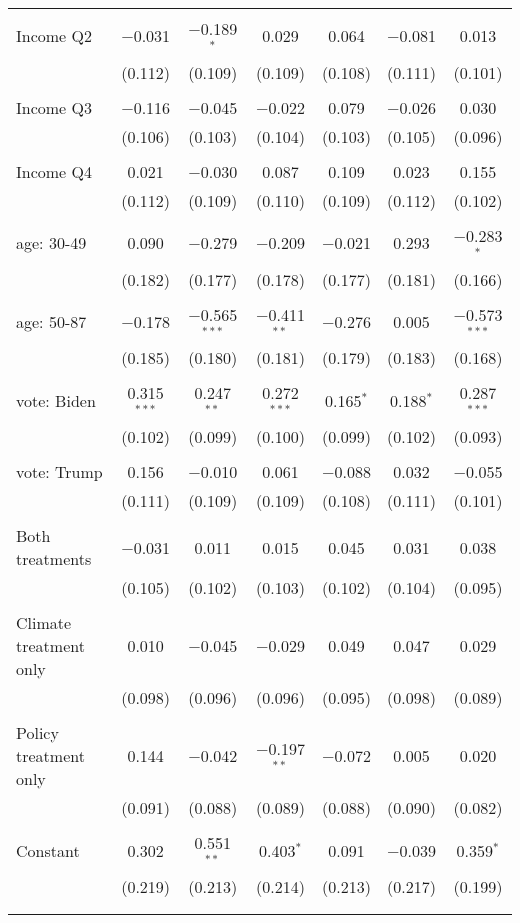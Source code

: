 \begin{tabular}{@{\extracolsep{5pt}}lcccccc}
  & & & & & & \\ 
 Income Q2 & $-$0.031 & $-$0.189$^{*}$ & 0.029 & 0.064 & $-$0.081 & 0.013 \\ 
  & (0.112) & (0.109) & (0.109) & (0.108) & (0.111) & (0.101) \\ 
  & & & & & & \\ 
 Income Q3 & $-$0.116 & $-$0.045 & $-$0.022 & 0.079 & $-$0.026 & 0.030 \\ 
  & (0.106) & (0.103) & (0.104) & (0.103) & (0.105) & (0.096) \\ 
  & & & & & & \\ 
 Income Q4 & 0.021 & $-$0.030 & 0.087 & 0.109 & 0.023 & 0.155 \\ 
  & (0.112) & (0.109) & (0.110) & (0.109) & (0.112) & (0.102) \\ 
  & & & & & & \\ 
 age: 30-49 & 0.090 & $-$0.279 & $-$0.209 & $-$0.021 & 0.293 & $-$0.283$^{*}$ \\ 
  & (0.182) & (0.177) & (0.178) & (0.177) & (0.181) & (0.166) \\ 
  & & & & & & \\ 
 age: 50-87 & $-$0.178 & $-$0.565$^{***}$ & $-$0.411$^{**}$ & $-$0.276 & 0.005 & $-$0.573$^{***}$ \\ 
  & (0.185) & (0.180) & (0.181) & (0.179) & (0.183) & (0.168) \\ 
  & & & & & & \\ 
 vote: Biden & 0.315$^{***}$ & 0.247$^{**}$ & 0.272$^{***}$ & 0.165$^{*}$ & 0.188$^{*}$ & 0.287$^{***}$ \\ 
  & (0.102) & (0.099) & (0.100) & (0.099) & (0.102) & (0.093) \\ 
  & & & & & & \\ 
 vote: Trump & 0.156 & $-$0.010 & 0.061 & $-$0.088 & 0.032 & $-$0.055 \\ 
  & (0.111) & (0.109) & (0.109) & (0.108) & (0.111) & (0.101) \\ 
  & & & & & & \\ 
 Both treatments & $-$0.031 & 0.011 & 0.015 & 0.045 & 0.031 & 0.038 \\ 
  & (0.105) & (0.102) & (0.103) & (0.102) & (0.104) & (0.095) \\ 
  & & & & & & \\ 
 Climate treatment only & 0.010 & $-$0.045 & $-$0.029 & 0.049 & 0.047 & 0.029 \\ 
  & (0.098) & (0.096) & (0.096) & (0.095) & (0.098) & (0.089) \\ 
  & & & & & & \\ 
 Policy treatment only & 0.144 & $-$0.042 & $-$0.197$^{**}$ & $-$0.072 & 0.005 & 0.020 \\ 
  & (0.091) & (0.088) & (0.089) & (0.088) & (0.090) & (0.082) \\ 
  & & & & & & \\ 
 Constant & 0.302 & 0.551$^{**}$ & 0.403$^{*}$ & 0.091 & $-$0.039 & 0.359$^{*}$ \\ 
  & (0.219) & (0.213) & (0.214) & (0.213) & (0.217) & (0.199) \\ 
  & & & & & & \\ 
\hline \\[-1.8ex] 


\end{tabular}
